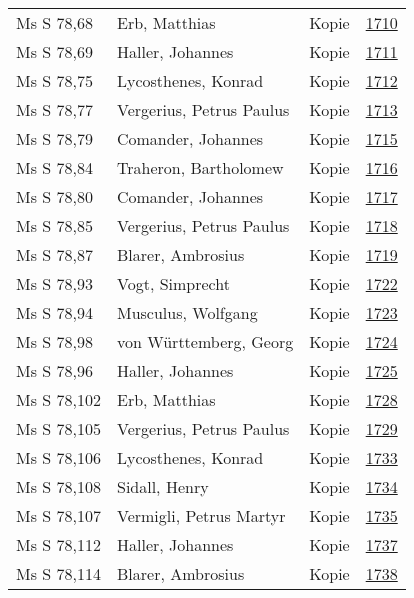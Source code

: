 \documentclass[10pt,a4paper,landscape]{report}
\begin{document}
\begin{longtable}{p{16cm}p{4cm}lr}
Ms S 78,68	&	Erb, Matthias	&	Kopie	&	\href{http://130.60.24.72/assignment/1710}{1710}\\
Ms S 78,69	&	Haller, Johannes	&	Kopie	&	\href{http://130.60.24.72/assignment/1711}{1711}\\
Ms S 78,75	&	Lycosthenes, Konrad	&	Kopie	&	\href{http://130.60.24.72/assignment/1712}{1712}\\
Ms S 78,77	&	Vergerius, Petrus Paulus	&	Kopie	&	\href{http://130.60.24.72/assignment/1713}{1713}\\
Ms S 78,79	&	Comander, Johannes	&	Kopie	&	\href{http://130.60.24.72/assignment/1715}{1715}\\
Ms S 78,84	&	Traheron, Bartholomew	&	Kopie	&	\href{http://130.60.24.72/assignment/1716}{1716}\\
Ms S 78,80	&	Comander, Johannes	&	Kopie	&	\href{http://130.60.24.72/assignment/1717}{1717}\\
Ms S 78,85	&	Vergerius, Petrus Paulus	&	Kopie	&	\href{http://130.60.24.72/assignment/1718}{1718}\\
Ms S 78,87	&	Blarer, Ambrosius	&	Kopie	&	\href{http://130.60.24.72/assignment/1719}{1719}\\
Ms S 78,93	&	Vogt, Simprecht	&	Kopie	&	\href{http://130.60.24.72/assignment/1722}{1722}\\
Ms S 78,94	&	Musculus, Wolfgang	&	Kopie	&	\href{http://130.60.24.72/assignment/1723}{1723}\\
Ms S 78,98	&	von Württemberg, Georg	&	Kopie	&	\href{http://130.60.24.72/assignment/1724}{1724}\\
Ms S 78,96	&	Haller, Johannes	&	Kopie	&	\href{http://130.60.24.72/assignment/1725}{1725}\\
Ms S 78,102	&	Erb, Matthias	&	Kopie	&	\href{http://130.60.24.72/assignment/1728}{1728}\\
Ms S 78,105	&	Vergerius, Petrus Paulus	&	Kopie	&	\href{http://130.60.24.72/assignment/1729}{1729}\\
Ms S 78,106	&	Lycosthenes, Konrad	&	Kopie	&	\href{http://130.60.24.72/assignment/1733}{1733}\\
Ms S 78,108	&	Sidall, Henry	&	Kopie	&	\href{http://130.60.24.72/assignment/1734}{1734}\\
Ms S 78,107	&	Vermigli, Petrus Martyr	&	Kopie	&	\href{http://130.60.24.72/assignment/1735}{1735}\\
Ms S 78,112	&	Haller, Johannes	&	Kopie	&	\href{http://130.60.24.72/assignment/1737}{1737}\\
Ms S 78,114	&	Blarer, Ambrosius	&	Kopie	&	\href{http://130.60.24.72/assignment/1738}{1738}\\

\end{longtable}
\end{document}
